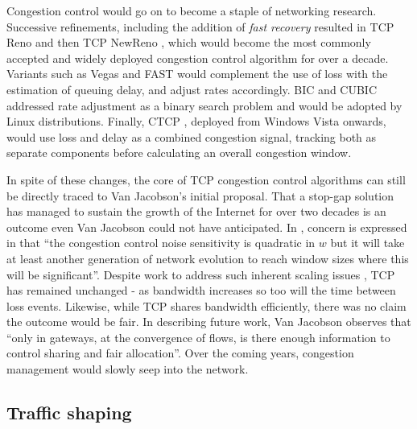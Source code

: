 Congestion control would go on to become a staple of networking research. Successive refinements, including the addition of \textit{fast recovery} resulted in \ac{TCP} Reno \cite{Stevens:1997p466} and then \ac{TCP} NewReno \cite{Paxson:1999p467}, which would become the most commonly accepted and widely deployed congestion control algorithm for over a decade. Variants such as Vegas \cite{Brakmo:1994p468} and \ac{FAST} \cite{Wei:2006p469} would complement the use of loss with the estimation of queuing delay, and adjust rates accordingly. \ac{BIC} and CUBIC \cite{Xu:2004p470,Ha:2008p471} addressed rate adjustment as a binary search problem and would be adopted by Linux distributions. Finally, \ac{CTCP} \cite{Tan06acompound}, deployed from Windows Vista onwards, would use loss and delay as a combined congestion signal, tracking both as separate components before calculating an overall congestion window.

In spite of these changes, the core of \ac{TCP} congestion control algorithms can still be directly traced to Van Jacobson's initial proposal. 
That a stop-gap solution has managed to sustain the growth of the Internet for over two decades is an outcome even Van Jacobson could not have anticipated. 
In \cite{Jacobson:1988p398}, concern is expressed in that ``the congestion control noise sensitivity is quadratic in $w$ but it will take at least another generation of network evolution to reach window sizes where this will be significant''. 
Despite work to address such inherent scaling issues \cite{Mathis:2009p309,Kelly:2003p475}, \ac{TCP} has remained unchanged - as bandwidth increases so too will the time between loss events.
Likewise, while \ac{TCP} shares bandwidth efficiently, there was no claim the outcome would be fair. In describing future work, Van Jacobson observes that ``only in gateways, at the convergence of flows, is there enough information to control sharing and fair allocation''. 
Over the coming years, congestion management would slowly seep into the network.




\subsection{Traffic shaping}
\label{sec:resourcepooling:shaping}

